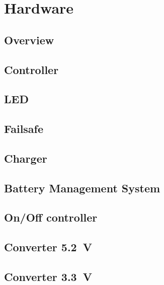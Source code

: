 \section{Hardware}

\subsection{Overview}

\subsection{Controller}

\subsection{LED}

\subsection{Failsafe}

\subsection{Charger}

\subsection{Battery Management System}

\subsection{On/Off controller}

\subsection{Converter \SI{5.2}{\volt}}

\subsection{Converter \SI{3.3}{\volt}}

